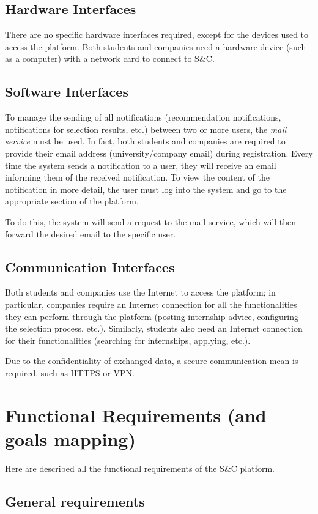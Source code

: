 		\subsection{Hardware Interfaces}
			There are no specific hardware interfaces required, except for the devices used to access the platform. Both students and companies need a hardware device (such as a computer) with a network card to connect to S\&C.
		\subsection{Software Interfaces}
				To manage the sending of all notifications (recommendation notifications, notifications for selection results, etc.) between two or more users, the \textit{mail service} must be used. In fact, both students and companies are required to provide their email address (university/company email) during registration. Every time the system sends a notification to a user, they will receive an email informing them of the received notification. To view the content of the notification in more detail, the user must log into the system and go to the appropriate section of the platform.
				
				To do this, the system will send a request to the mail service, which will then forward the desired email to the specific user.
		\subsection{Communication Interfaces}
			Both students and companies use the Internet to access the platform; in particular, companies require an Internet connection for all the functionalities they can perform through the platform (posting internship advice, configuring the selection process, etc.). Similarly, students also need an Internet connection for their functionalities (searching for internships, applying, etc.).
			
			Due to the confidentiality of exchanged data, a secure communication mean is required, such as HTTPS or VPN.
	\section{Functional Requirements (and goals mapping)}
		Here are described all the functional requirements of the S\&C platform.
		
		\subsection{General requirements}
		
